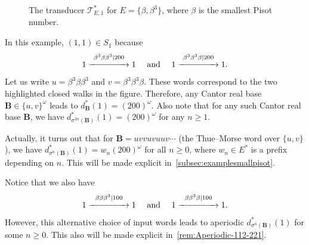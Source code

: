 \documentclass[12pt,reqno]{amsart}
\newcommand{\B}{{\mathbf{B}}}
\begin{document}
\begin{example}
\begin{figure}[ht]
\begin{center}
\end{center}
\caption{The transducer $\mathcal{T}^*_{E,1}$ for  $E=\{\beta,\beta^3\}$, where $\beta$ is the smallest Pisot number.}
\label{fig:exa2}
\end{figure}
In this example, $(1,1) \in S_1$ because 
\[
    1\stackrel{\beta^3\beta\beta^3|200}{\xrightarrow{\hspace{1.5 cm}}} 1 
    \quad\text{ and }\quad
    1\stackrel{\beta^3\beta^3\beta|200}{\xrightarrow{\hspace{1.5 cm}}} 1.
\]
Let us write $u=\beta^3\beta\beta^3$ and $v=\beta^3\beta^3\beta$. These words correspond to the two highlighted closed walks in the figure. 
Therefore, any Cantor real base $\B\in\{u,v\}^\omega$ leads to $d_{\B}^{*}(1)=(200)^{\omega}$. Also note that for any such Cantor real base $\B$, we have $d_{\sigma^{3n}(\B)}^*(1)=(200)^{\omega}$ for any $n\ge 1$. 

Actually, it turns out that for $\B=uvvuvuuv\cdots$ (the Thue--Morse word over $\{u,v\}$), we have $d_{\sigma^n(\B)}^{*}(1)=w_n(200)^{\omega}$ for all $n\ge 0$, where $w_n\in E^*$ is a prefix depending on $n$. This will be made explicit in~\cref{subsec:examplesmallpisot}. 

Notice that we also have 
\[
    1\stackrel{\beta\beta\beta^3|100}{\xrightarrow{\hspace{1.5 cm}}} 1 
    \quad\text{ and }\quad
    1\stackrel{\beta\beta^3\beta|100}{\xrightarrow{\hspace{1.5 cm}}} 1.
\] 
However, this alternative choice of input words leads to aperiodic $d_{\sigma^n(\B)}^{*}(1)$ for some $n\geq 0$. This also will be made explicit in~\cref{rem:Aperiodic-112-221}. 
\end{example}







\end{document}
